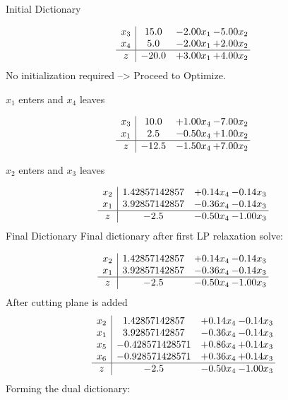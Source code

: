 \documentclass[8pt]{article}
\begin{document}
Initial Dictionary 

\[\begin{array}{c| c c@{\hskip 2pt} c@{\hskip 2pt} }
 x_{3}   &  15.0 & -2.00 x_{1} & -5.00 x_{2}\\
 x_{4}   &  5.0 & -2.00 x_{1} & +  2.00 x_{2}\\
\hline
z    &  -20.0 & +  3.00 x_{1} & +  4.00 x_{2}\\
\end{array}\]
No initialization required --> Proceed to Optimize. 


 $ x_{1} $ enters and $ x_{4} $ leaves 

 \[\begin{array}{c| c c@{\hskip 2pt} c@{\hskip 2pt} }
 x_{3}   &  10.0 & +  1.00 x_{4} & -7.00 x_{2}\\
 x_{1}   &  2.5 & -0.50 x_{4} & +  1.00 x_{2}\\
\hline
z    &  -12.5 & -1.50 x_{4} & +  7.00 x_{2}\\
\end{array}\]


 $ x_{2} $ enters and $ x_{3} $ leaves 

 \[\begin{array}{c| c c@{\hskip 2pt} c@{\hskip 2pt} }
 x_{2}   &  1.42857142857 & +  0.14 x_{4} & -0.14 x_{3}\\
 x_{1}   &  3.92857142857 & -0.36 x_{4} & -0.14 x_{3}\\
\hline
z    &  -2.5 & -0.50 x_{4} & -1.00 x_{3}\\
\end{array}\]
Final Dictionary
Final dictionary after first LP relaxation solve: 

\[\begin{array}{c| c c@{\hskip 2pt} c@{\hskip 2pt} }
 x_{2}   &  1.42857142857 & +  0.14 x_{4} & -0.14 x_{3}\\
 x_{1}   &  3.92857142857 & -0.36 x_{4} & -0.14 x_{3}\\
\hline
z    &  -2.5 & -0.50 x_{4} & -1.00 x_{3}\\
\end{array}\]
 After cutting plane is added 
\[\begin{array}{c| c c@{\hskip 2pt} c@{\hskip 2pt} }
 x_{2}   &  1.42857142857 & +  0.14 x_{4} & -0.14 x_{3}\\
 x_{1}   &  3.92857142857 & -0.36 x_{4} & -0.14 x_{3}\\
 x_{5}   &  -0.428571428571 & +  0.86 x_{4} & +  0.14 x_{3}\\
 x_{6}   &  -0.928571428571 & +  0.36 x_{4} & +  0.14 x_{3}\\
\hline
z    &  -2.5 & -0.50 x_{4} & -1.00 x_{3}\\
\end{array}\]
Forming the dual dictionary:
\end{document}
